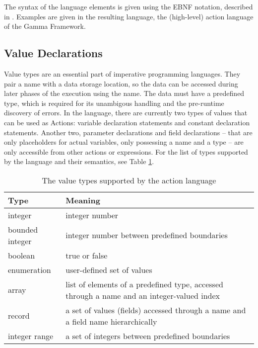 The syntax of the language elements is given using the EBNF notation, described in \cite{EBNFStandard}. Examples are given in the resulting language, the (high-level) action language of the Gamma Framework.

\subsection{Value Declarations}
Value types are an essential part of imperative programming languages. They pair a name with a data storage location, so the data can be accessed during later phases of the execution using the name. The data must have a predefined type, which is required for its unambigous handling and the pre-runtime discovery of errors. In the language, there are currently two types of values that can be used as Actions: variable declaration statements and constant declaration statements. Another two, parameter declarations and field declarations -- that are only placeholders for actual variables, only possessing a name and a type -- are only accessible from other actions or expressions. For the list of types supported by the language and their semantics, see Table \ref{tab:SCTypes}.
\begin{table}[ht]
	\footnotesize
	\centering
	\begin{tabular}{ l l }
		\toprule
		Type & Meaning \\
		\midrule
		integer & integer number \\
		bounded integer & integer number between predefined boundaries\\
		boolean & true or false  \\
		enumeration & user-defined set of values  \\
		array & list of elements of a predefined type, accessed through a name and an integer-valued index  \\
		record & a set of values (fields) accessed through a name and a field name hierarchically  \\
		integer range & a set of integers between predefined boundaries  \\
		\bottomrule
	\end{tabular}
	\caption{The value types supported by the action language}
	\label{tab:SCTypes}
\end{table} 


